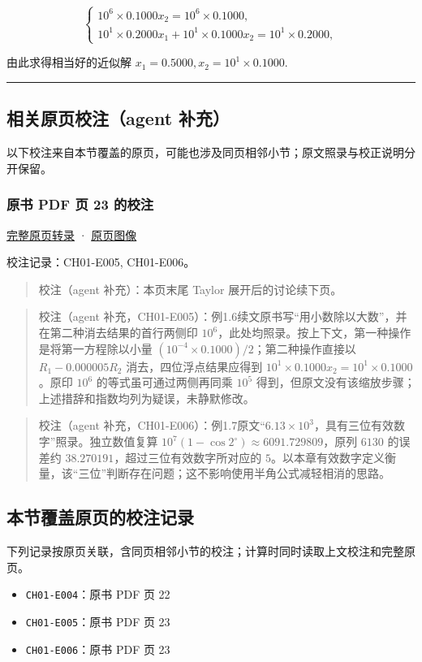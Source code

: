\documentclass[
  10pt,
  fontset=fandol]{ctexart}
\providecommand{\tightlist}{%
  \setlength{\itemsep}{0pt}\setlength{\parskip}{0pt}}
\begin{document}
\[
\begin{cases} 10^6 \times 0.1000x_2 = 10^6 \times 0.1000, \\ 10^1 \times 0.2000x_1 + 10^1 \times 0.1000x_2 = 10^1 \times 0.2000, \end{cases}
\]

由此求得相当好的近似解 \(x_1=0.5000, x_2=10^1 \times 0.1000\).

\begin{center}\rule{0.5\linewidth}{0.5pt}\end{center}

\subsection{相关原页校注（agent 补充）}\label{ux76f8ux5173ux539fux9875ux6821ux6ce8agent-ux8865ux5145}

以下校注来自本节覆盖的原页，可能也涉及同页相邻小节；原文照录与校正说明分开保留。

\subsubsection{原书 PDF 页 23 的校注}\label{ux539fux4e66-pdf-ux9875-23-ux7684ux6821ux6ce8}

\href{../pages/pdf-023.md}{完整原页转录} · \href{../../source-images/pdf-023.jpeg}{原页图像}

校注记录：CH01-E005, CH01-E006。

\begin{quote}
校注（agent 补充）：本页末尾 Taylor 展开后的讨论续下页。
\end{quote}

\begin{quote}
校注（agent 补充，CH01-E005）：例1.6续文原书写``用小数除以大数''，并在第二种消去结果的首行两侧印 \(10^6\)，此处均照录。按上下文，第一种操作是将第一方程除以小量 \((10^{-4}\times0.1000)/2\)；第二种操作直接以 \(R_1-0.000005R_2\) 消去，四位浮点结果应得到 \(10^1\times0.1000x_2=10^1\times0.1000\)。原印 \(10^6\) 的等式虽可通过两侧再同乘 \(10^5\) 得到，但原文没有该缩放步骤；上述措辞和指数均列为疑误，未静默修改。
\end{quote}

\begin{quote}
校注（agent 补充，CH01-E006）：例1.7原文``\(6.13\times10^3\)，具有三位有效数字''照录。独立数值复算 \(10^7(1-\cos2^\circ)\approx6091.729809\)，原列 \(6130\) 的误差约 \(38.270191\)，超过三位有效数字所对应的 \(5\)。以本章有效数字定义衡量，该``三位''判断存在问题；这不影响使用半角公式减轻相消的思路。
\end{quote}

\subsection{本节覆盖原页的校注记录}\label{ux672cux8282ux8986ux76d6ux539fux9875ux7684ux6821ux6ce8ux8bb0ux5f55}

下列记录按原页关联，含同页相邻小节的校注；计算时同时读取上文校注和完整原页。

\begin{itemize}
\tightlist
\item
  \texttt{CH01-E004}：原书 PDF 页 22
\item
  \texttt{CH01-E005}：原书 PDF 页 23
\item
  \texttt{CH01-E006}：原书 PDF 页 23
\end{itemize}
\end{document}
